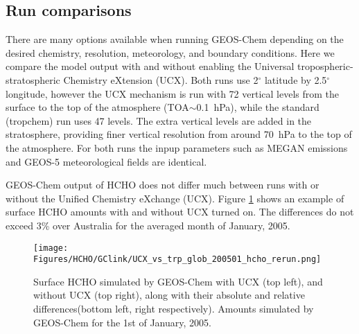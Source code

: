     \subsection{Run comparisons}
    
      There are many options available when running GEOS-Chem depending on the desired chemistry, resolution, meteorology, and boundary conditions.
      Here we compare the model output with and without enabling the Universal tropospheric-stratospheric Chemistry eXtension (UCX).
      Both runs use 2$^{\circ}$ latitude by 2.5$^{\circ}$ longitude, however the UCX mechanism is run with 72 vertical levels from the surface to the top of the atmosphere (TOA$\sim$0.1~hPa), while the standard (tropchem) run uses 47 levels.
      The extra vertical levels are added in the stratosphere, providing finer vertical resolution from around 70~hPa to the top of the atmosphere.
      For both runs the inpup parameters such as MEGAN emissions and GEOS-5 meteorological fields are identical.
      
      GEOS-Chem output of HCHO does not differ much between runs with or without the Unified Chemistry eXchange (UCX).
      Figure \ref{Model:GC:running:fig_UCXvsTrop_HCHO} shows an example of surface HCHO amounts with and without UCX turned on.
      The differences do not exceed 3\% over Australia for the averaged month of January, 2005.
      
      \begin{figure}%
        \texttt{[image: Figures/HCHO/GClink/UCX\_vs\_trp\_glob\_200501\_hcho\_rerun.png]}
        \caption{ %
          Surface HCHO simulated by GEOS-Chem with UCX (top left), and without UCX (top right), along with their absolute and relative differences(bottom left, right respectively).
          Amounts simulated by GEOS-Chem for the 1st of January, 2005.
        }
        \label{Model:GC:running:fig_UCXvsTrop_HCHO}
      \end{figure}
      

